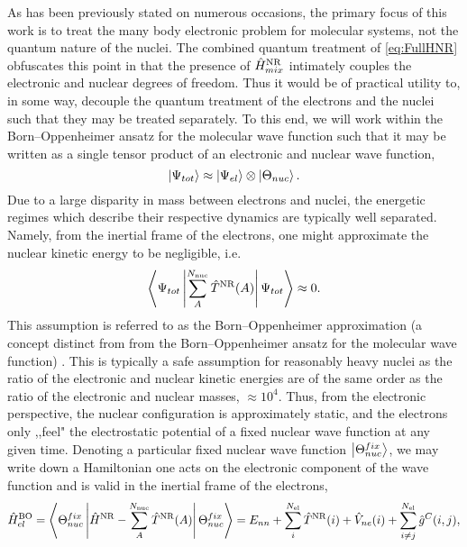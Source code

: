 As has been previously stated on numerous occasions, the primary focus of this work is to treat the many body
electronic problem for molecular systems, not the quantum nature of the nuclei. The combined quantum treatment
of \cref{eq:FullHNR} obfuscates this point in that the presence of $\hat{H}^{\mathrm{NR}}_{mix}$ intimately couples the
electronic and nuclear degrees of freedom. Thus it would be of practical utility to, in some way, decouple
the quantum treatment of the electrons and the nuclei such that they may be treated separately. 
To this end, we will work within the Born--Oppenheimer ansatz for the molecular wave function  such
that it may be written as a single tensor product of an electronic and nuclear wave function,
\begin{equation}
  \left\vert \Psi_{tot} \right\rangle \approx \left\vert \Psi_{el} \right\rangle \otimes \left\vert \Theta_{nuc} \right\rangle.
\end{equation}
Due to a large disparity in mass between electrons and nuclei, the energetic regimes which describe their respective
dynamics are typically well separated. Namely, from the inertial frame of the electrons, one might approximate
the nuclear kinetic energy to be negligible, i.e.
\begin{equation}
\left\langle \Psi_{tot} \left\vert \sum_A^{N_\mathrm{nuc}} \hat{T}^{\mathrm{NR}}(A)  \right\vert \Psi_{tot} \right\rangle \approx 0.
\end{equation}
This assumption is referred to as the Born--Oppenheimer approximation (a concept distinct from from the 
Born--Oppenheimer ansatz for the molecular wave function) . This is typically a safe assumption for reasonably
heavy nuclei as the ratio of the electronic and nuclear kinetic energies are of the same order as
the ratio of the electronic and nuclear masses, $\approx 10^{4}$. Thus, from the electronic perspective,
the nuclear configuration is approximately static, and the electrons only ,,feel" the electrostatic
potential of a fixed nuclear wave function at any given time. Denoting a particular fixed nuclear wave
function $\left\vert \Theta_{nuc}^{fix} \right\rangle$, we may write down a Hamiltonian one acts on the electronic 
component of the wave function and is valid in the inertial frame of the electrons,
\begin{equation}
\label{eq:NRBOH}
\hat{H}^{\mathrm{BO}}_{el} = \left\langle \Theta_{nuc}^{fix} \left\vert \hat{H}^{\mathrm{NR}} - \sum_A^{N_\mathrm{nuc}}\hat{T}^{\mathrm{NR}}(A) \right\vert \Theta_{nuc}^{fix} \right\rangle
=E_{nn} + \sum_i^{N_\mathrm{el}} \hat{T}^{\mathrm{NR}}(i) + \hat{V}_{ne}(i) + \sum_{i\neq j}^{N_\mathrm{el}} \hat{g}^C(i,j),
\end{equation}
